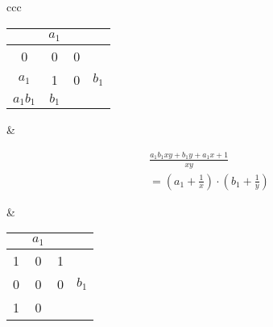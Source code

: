 \documentclass[preview]{standalone}
\begin{document}
\begin{tabular}{ccc}

\begin{tabular}{ c c c | c}
    & $a_1$ &  & \\  
    \hline
    0  & 0 & 0  & \\
    \cellcolor{yellow} $a_1$ & \cellcolor{yellow} 1 & 0  & $b_1$ \\
    \cellcolor{yellow} $a_1 b_1 $ & \cellcolor{yellow} $b_1$  &  & \\
\end{tabular} & 

\parbox{4cm}{
    \begin{center}
    \begin{equation*}
    \begin{split}
        \frac{a_1 b_1x y + b_1 y + a_1 x + 1}{xy} \\
        = (a_1 + \frac{1}{x}) \cdot (b_1 + \frac{1}{y})
    \end{split}
    \end{equation*}
    \end{center}
} &
\begin{tabular}{ c c c | c}
    & $a_1$ &  & \\  
    \hline
    1  & 0 & 1  & \\
    \cellcolor{yellow} 0 & \cellcolor{yellow} 0 & 0  & $b_1$ \\
    \cellcolor{yellow} 1 & \cellcolor{yellow} 0  &  & \\
\end{tabular} 

\end{tabular}
\end{document}
